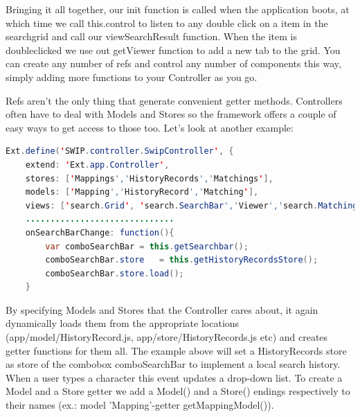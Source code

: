 \par Bringing it all together, our init function is called when the application boots, at which time we call this.control to listen to any double click on a item in the searchgrid and call our viewSearchResult function. When the item is doubleclicked we use out getViewer function to add a new tab to the grid. You can create any number of refs and control any number of components this way, simply adding more functions to your Controller as you go. \\
\par Refs aren't the only thing that generate convenient getter methods. Controllers often have to deal with Models and Stores so the framework offers a couple of easy ways to get access to those too. Let's look at another example:\\
\begin{lstlisting}[language=Java]
Ext.define('SWIP.controller.SwipController', {
	extend: 'Ext.app.Controller',
   	stores: ['Mappings','HistoryRecords','Matchings'],
   	models: ['Mapping','HistoryRecord','Matching'],
   	views: ['search.Grid', 'search.SearchBar','Viewer','search.MatchingGrid'],
   	..............................
   	onSearchBarChange: function(){
    	var comboSearchBar = this.getSearchbar();
       	comboSearchBar.store   = this.getHistoryRecordsStore();
       	comboSearchBar.store.load();
   	}
\end{lstlisting}
\par By specifying Models and Stores that the Controller cares about, it again dynamically loads them from the appropriate locations (app/model/HistoryRecord.js, app/store/HistoryRecords.js etc) and creates getter functions for them all. The example above will set a HistoryRecords store as store of the combobox comboSearchBar to implement a local search history. When a user types a character this event updates a drop-down list. 
To create a Model and a Store getter we add a Model() and a Store() endings respectively to their names (ex.: model 'Mapping'-getter getMappingModel()).\\


